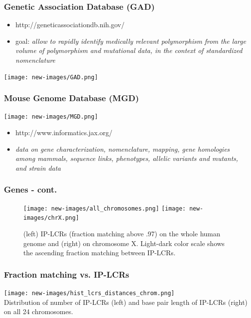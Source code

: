 \begin{frame}\frametitle{Genetic Association Database (GAD)}  
\begin{itemize}  
 \item http://geneticassociationdb.nih.gov/
 \item goal: \textit{allow to rapidly identify medically relevant polymorphism from the large volume of polymorphism and mutational data, in the context of standardized nomenclature} 
\end{itemize}
\begin{center}
	   \texttt{[image: new-images/GAD.png]}\\	   
	    \end{center}
\end{frame}


\begin{frame}\frametitle{Mouse Genome Database (MGD)}  

\begin{center}
	   \texttt{[image: new-images/MGD.png]}\\	   
	    \end{center}

\begin{itemize}  
 \item http://www.informatics.jax.org/
 \item \textit{data on gene characterization, nomenclature, mapping, gene homologies among mammals, sequence links, phenotypes, allelic variants and mutants, and strain data} 
\end{itemize}

\end{frame}





\begin{frame}\frametitle{Genes - cont.}  
\begin{figure}
 \centering  
 \texttt{[image: new-images/all\_chromosomes.png]}
 \texttt{[image: new-images/chrX.png]} 
 \label{fig:nitrogen_lipids}
\caption{(left) IP-LCRs (fraction matching above .97) on the whole human genome and
(right) on chromosome X. Light-dark color scale shows the ascending fraction matching between IP-LCRs.}
\end{figure}
\end{frame}

\begin{frame}\frametitle{Fraction matching vs. IP-LCRs}  
	   \texttt{[image: new-images/hist\_lcrs\_distances\_chrom.png]}\\
Distribution of number of IP-LCRs (left) and base pair length of IP-LCRs (right) on all 24 chromosomes.
\end{frame}

